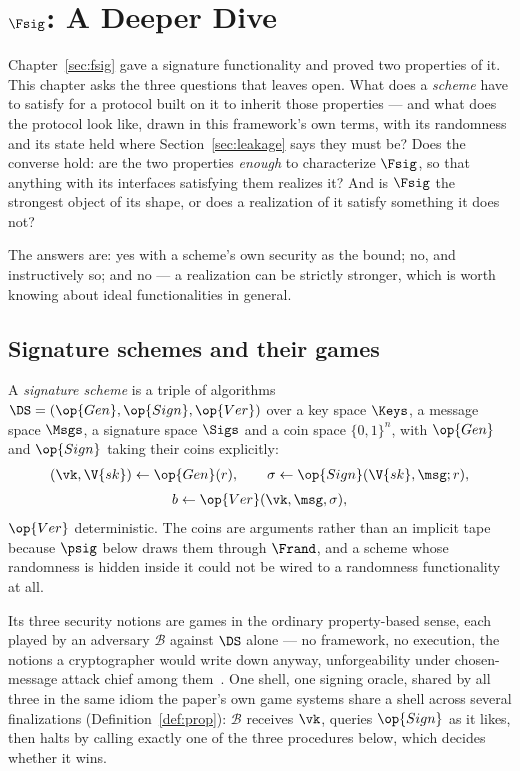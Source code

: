 \documentclass[10pt,oneside,openany]{book}
\makeatletter
\newcommand{\nav@headtext}{}
\newcommand{\nav@setheadtext}[1]{%
  \gdef\nav@headtext{%
    \ifnum\c@secnumdepth>\m@ne
      \if@mainmatter \@chapapp\ \thechapter.\ \fi
    \fi #1}}
\newcommand{\chapterhead}[1]{\nav@setheadtext{#1}}
\theoremstyle{accentdef}
\theoremstyle{accentplain}
\makeatother
\begin{document}
\chapter{\texorpdfstring{$\Fsig$}{F\_Sig}: A Deeper Dive}\label{sec:sigdeep}
\chapterhead{F-Sig: A Deeper Dive}

Chapter~\ref{sec:fsig} gave a signature functionality and proved two properties of it. This
chapter asks the three questions that leaves open. What does a \emph{scheme} have to satisfy for
a protocol built on it to inherit those properties --- and what does the protocol look like, drawn
in this framework's own terms, with its randomness and its state held where
Section~\ref{sec:leakage} says they must be? Does the converse hold: are the two properties
\emph{enough} to characterize $\Fsig$, so that anything with its interfaces satisfying them
realizes it? And is $\Fsig$ the strongest object of its shape, or does a realization of it satisfy
something it does not?

The answers are: yes with a scheme's own security as the bound; no, and instructively so; and no
--- a realization can be strictly stronger, which is worth knowing about ideal functionalities in
general.

\section{Signature schemes and their games}\label{sec:dssyntax}

A \emph{signature scheme} is a triple of algorithms $\DS = (\op{Gen},\op{Sign},\op{Ver})$ over a
key space $\Keys$, a message space $\Msgs$, a signature space $\Sigs$ and a coin space
$\{0,1\}^{n}$, with $\op{Gen}$ and $\op{Sign}$ taking their coins explicitly:
\[
  \begin{gathered}
  (\vk, \V{sk}) \gets \op{Gen}(r) , \qquad
  \sigma \gets \op{Sign}(\V{sk}, \msg; r) , \\[3pt]
  b \gets \op{Ver}(\vk, \msg, \sigma) ,
  \end{gathered}
\]
$\op{Ver}$ deterministic. The coins are arguments rather than an implicit tape because $\psig$
below draws them through $\Frand$, and a scheme whose randomness is hidden inside it could not be
wired to a randomness functionality at all.

Its three security notions are games in the ordinary property-based sense, each played by an
adversary $\mathcal{B}$ against $\DS$ alone --- no framework, no execution, the notions a
cryptographer would write down anyway, unforgeability under chosen-message attack chief among
them~\cite{GMR88}. One shell, one signing oracle, shared by all three in the
same idiom the paper's own game systems share a shell across several finalizations
(Definition~\ref{def:prop}): $\mathcal{B}$ receives $\vk$, queries $\op{Sign}$ as it likes, then
halts by calling exactly one of the three procedures below, which decides whether it wins.
\end{document}
